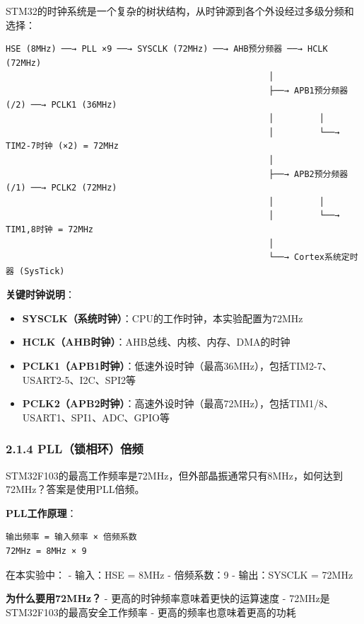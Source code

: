 \documentclass[
  chinese,
  UTF8,
  oneside,
  openany]{ctexbook}
\providecommand{\tightlist}{%
  \setlength{\itemsep}{0pt}\setlength{\parskip}{0pt}}
\begin{document}
STM32的时钟系统是一个复杂的树状结构，从时钟源到各个外设经过多级分频和选择：

\begin{verbatim}
HSE (8MHz) ──→ PLL ×9 ──→ SYSCLK (72MHz) ──→ AHB预分频器 ──→ HCLK (72MHz)
                                                    │
                                                    ├──→ APB1预分频器 (/2) ──→ PCLK1 (36MHz)
                                                    │         │
                                                    │         └──→ TIM2-7时钟 (×2) = 72MHz
                                                    │
                                                    ├──→ APB2预分频器 (/1) ──→ PCLK2 (72MHz)
                                                    │         │
                                                    │         └──→ TIM1,8时钟 = 72MHz
                                                    │
                                                    └──→ Cortex系统定时器 (SysTick)
\end{verbatim}

\textbf{关键时钟说明}：

\begin{itemize}
\tightlist
\item
  \textbf{SYSCLK（系统时钟）}：CPU的工作时钟，本实验配置为72MHz
\item
  \textbf{HCLK（AHB时钟）}：AHB总线、内核、内存、DMA的时钟
\item
  \textbf{PCLK1（APB1时钟）}：低速外设时钟（最高36MHz），包括TIM2-7、USART2-5、I2C、SPI2等
\item
  \textbf{PCLK2（APB2时钟）}：高速外设时钟（最高72MHz），包括TIM1/8、USART1、SPI1、ADC、GPIO等
\end{itemize}

\subsubsection{2.1.4
PLL（锁相环）倍频}\label{pllux9501ux76f8ux73afux500dux9891}

STM32F103的最高工作频率是72MHz，但外部晶振通常只有8MHz，如何达到72MHz？答案是使用PLL倍频。

\textbf{PLL工作原理}：

\begin{verbatim}
输出频率 = 输入频率 × 倍频系数
72MHz = 8MHz × 9
\end{verbatim}

在本实验中： - 输入：HSE = 8MHz - 倍频系数：9 - 输出：SYSCLK = 72MHz

\textbf{为什么要用72MHz？} - 更高的时钟频率意味着更快的运算速度 -
72MHz是STM32F103的最高安全工作频率 - 更高的频率也意味着更高的功耗
\end{document}
